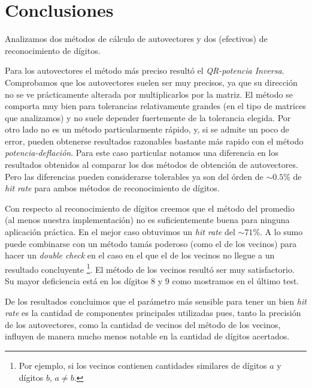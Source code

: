 \section{Conclusiones}

	\PARstart Analizamos dos m\'etodos de c\'alculo de autovectores y dos (efectivos)
	de reconocimiento de d\'igitos.

	Para los autovectores el m\'etodo m\'as preciso result\'o el
	\textit{QR-potencia Inversa}. Comprobamos que los autovectores suelen
	ser muy precisos, ya que su direcci\'on no se ve pr\'acticamente alterada
	por multiplicarlos por la matriz. El m\'etodo se comporta muy bien para
	tolerancias relativamente grandes (en el tipo de matrices que analizamos)
	y no suele depender fuertemente de la tolerancia elegida. Por otro lado
	no es un m\'etodo particularmente r\'apido, y, si se admite un poco de
	error, pueden obtenerse resultados razonables bastante m\'as rapido
	con el m\'etodo \textit{potencia-deflaci\'on}. Para este caso particular
	notamos una diferencia en los resultados obtenidos al comparar los
	dos m\'etodos de obtenci\'on de autovectores. Pero las diferencias
	pueden considerarse tolerables ya son del \'orden de $\sim 0.5\%$ de \textit{hit rate} para
	ambos m\'etodos de reconocimiento de d\'igitos.

	Con respecto al reconocimiento de d\'igitos creemos que el m\'etodo del
	promedio (al menos nuestra implementaci\'on) no es suficientemente buena
	para ninguna aplicaci\'on pr\'actica. En el mejor caso obtuvimos un
	\textit{hit rate} del $\sim 71\%$. A lo sumo puede combinarse con un m\'etodo
	tam\'as poderoso (como el de los vecinos) para hacer un \textit{double check}
	en el caso en el que el de los vecinos no llegue a un resultado concluyente
	\footnote{Por ejemplo, si los vecinos contienen cantidades similares
	de d\'igitos $a$ y d\'igitos $b$, $a\neq b$.}.
	El m\'etodo de los vecinos result\'o ser muy satisfactorio. Su mayor
	deficiencia est\'a en los d\'igitos $8$ y $9$ como mostramos en el \'ultimo
	test.


	De los resultados concluimos que el par\'ametro m\'as sensible
	para tener un bien \textit{hit rate} es la cantidad de componentes principales utilizadas
	pues, tanto la precisi\'on de los autovectores, como la cantidad de vecinos
	del m\'etodo de los vecinos, influyen de manera mucho menos notable
	en la cantidad de d\'igitos acertados.
